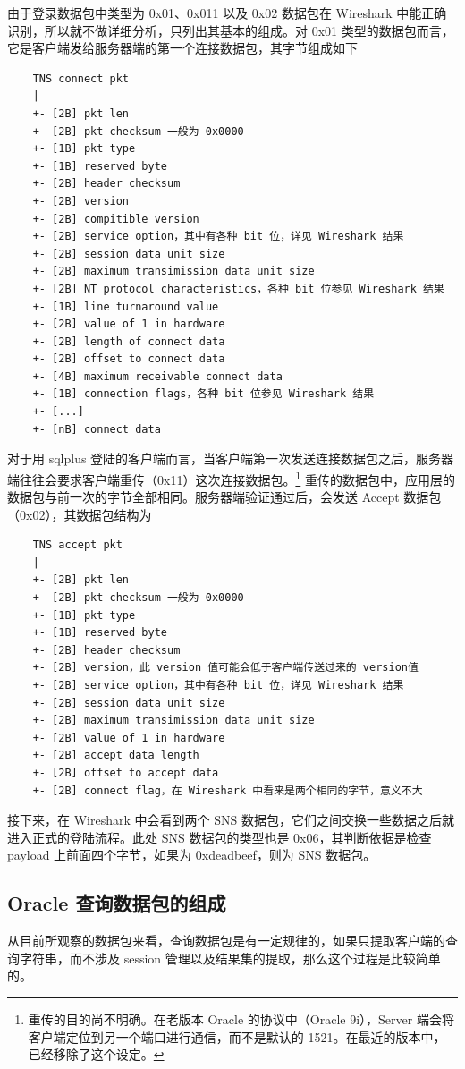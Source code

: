 由于登录数据包中类型为 {\cf 0x01}、{\cf 0x011} 以及 {\cf 0x02} 数据包在 Wireshark 中能正确识别，所以就不做详细分析，只列出其基本的组成。对 {\cf 0x01} 类型的数据包而言，它是客户端发给服务器端的第一个连接数据包，其字节组成如下

\begin{lstlisting}
    TNS connect pkt
    |
    +- [2B] pkt len
    +- [2B] pkt checksum 一般为 0x0000
    +- [1B] pkt type
    +- [1B] reserved byte
    +- [2B] header checksum
    +- [2B] version
    +- [2B] compitible version
    +- [2B] service option，其中有各种 bit 位，详见 Wireshark 结果
    +- [2B] session data unit size
    +- [2B] maximum transimission data unit size
    +- [2B] NT protocol characteristics，各种 bit 位参见 Wireshark 结果
    +- [1B] line turnaround value
    +- [2B] value of 1 in hardware
    +- [2B] length of connect data
    +- [2B] offset to connect data
    +- [4B] maximum receivable connect data
    +- [1B] connection flags，各种 bit 位参见 Wireshark 结果
    +- [...]
    +- [nB] connect data
\end{lstlisting}

对于用 sqlplus 登陆的客户端而言，当客户端第一次发送连接数据包之后，服务器端往往会要求客户端重传（{\cf 0x11}）这次连接数据包。\footnote{重传的目的尚不明确。在老版本 Oracle 的协议中（Oracle 9i），Server 端会将客户端定位到另一个端口进行通信，而不是默认的 1521。在最近的版本中，已经移除了这个设定。}
重传的数据包中，应用层的数据包与前一次的字节全部相同。服务器端验证通过后，会发送 Accept 数据包（{\cf 0x02}），其数据包结构为

\begin{lstlisting}
    TNS accept pkt
    |
    +- [2B] pkt len
    +- [2B] pkt checksum 一般为 0x0000
    +- [1B] pkt type
    +- [1B] reserved byte
    +- [2B] header checksum
    +- [2B] version，此 version 值可能会低于客户端传送过来的 version值
    +- [2B] service option，其中有各种 bit 位，详见 Wireshark 结果
    +- [2B] session data unit size
    +- [2B] maximum transimission data unit size
    +- [2B] value of 1 in hardware
    +- [2B] accept data length
    +- [2B] offset to accept data
    +- [2B] connect flag，在 Wireshark 中看来是两个相同的字节，意义不大
\end{lstlisting}

接下来，在 Wireshark 中会看到两个 SNS 数据包，它们之间交换一些数据之后就进入正式的登陆流程。此处 SNS 数据包的类型也是 {\cf 0x06}，其判断依据是检查 payload 上前面四个字节，如果为 {\cf 0xdeadbeef}，则为 SNS 数据包。

\subsection{Oracle 查询数据包的组成}\label{sec:oracle-query-string}
从目前所观察的数据包来看，查询数据包是有一定规律的，如果只提取客户端的查询字符串，而不涉及 session 管理以及结果集的提取，那么这个过程是比较简单的。

